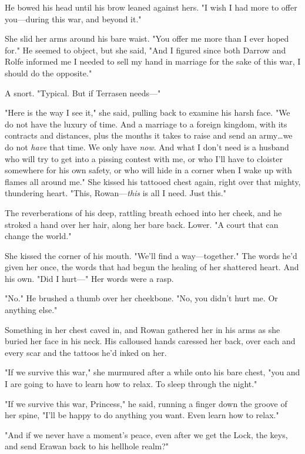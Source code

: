 He bowed his head until his brow leaned against hers.
"I wish I had more to offer you---during this war, and beyond it."

She slid her arms around his bare waist.
"You offer me more than I ever hoped for."
He seemed to object, but she said, "And I figured since both Darrow and Rolfe informed me I needed to sell my hand in marriage for the sake of this war, I should do the opposite."

A snort.
"Typical.
But if Terrasen needs---"

"Here is the way I see it," she said, pulling back to examine his harsh face.
"We do not have the luxury of time.
And a marriage to a foreign kingdom, with its contracts and distances, plus the months it takes to raise and send an army\ldots we do not \emph{have} that time.
We only have \emph{now}.
And what I don't need is a husband who will try to get into a pissing contest with me, or who I'll have to cloister somewhere for his own safety, or who will hide in a corner when I wake up with flames all around me."
She kissed his tattooed chest again, right over that mighty, thundering heart.
"This, Rowan---\emph{this} is all I need.
Just this."

The reverberations of his deep, rattling breath echoed into her cheek, and he stroked a hand over her hair, along her bare back.
Lower.
"A court that can change the world."

She kissed the corner of his mouth.
"We'll find a way---together."
The words he'd given her once, the words that had begun the healing of her shattered heart.
And his own.
"Did I hurt---" Her words were a rasp.

"No."
He brushed a thumb over her cheekbone.
"No, you didn't hurt me.
Or anything else."

Something in her chest caved in, and Rowan gathered her in his arms as she buried her face in his neck.
His calloused hands caressed her back, over each and every scar and the tattoos he'd inked on her.

"If we survive this war," she murmured after a while onto his bare chest, "you and I are going to have to learn how to relax.
To sleep through the night."

"If we survive this war, Princess," he said, running a finger down the groove of her spine, "I'll be happy to do anything you want.
Even learn how to relax."

"And if we never have a moment's peace, even after we get the Lock, the keys, and send Erawan back to his hellhole realm?"

